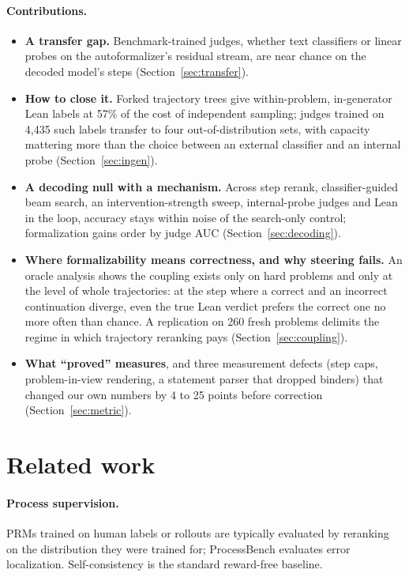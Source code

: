 \documentclass[10pt]{article}
\begin{document}
\paragraph{Contributions.}
\begin{itemize}
\item \textbf{A transfer gap.} Benchmark-trained judges, whether text classifiers or linear probes on the autoformalizer's residual stream, are near chance on the decoded model's steps (Section~\ref{sec:transfer}).
\item \textbf{How to close it.} Forked trajectory trees give within-problem, in-generator Lean labels at 57\% of the cost of independent sampling; judges trained on 4{,}435 such labels transfer to four out-of-distribution sets, with capacity mattering more than the choice between an external classifier and an internal probe (Section~\ref{sec:ingen}).
\item \textbf{A decoding null with a mechanism.} Across step rerank, classifier-guided beam search, an intervention-strength sweep, internal-probe judges and Lean in the loop, accuracy stays within noise of the search-only control; formalization gains order by judge AUC (Section~\ref{sec:decoding}).
\item \textbf{Where formalizability means correctness, and why steering fails.} An oracle analysis shows the coupling exists only on hard problems and only at the level of whole trajectories: at the step where a correct and an incorrect continuation diverge, even the true Lean verdict prefers the correct one no more often than chance. A replication on 260 fresh problems delimits the regime in which trajectory reranking pays (Section~\ref{sec:coupling}).
\item \textbf{What ``proved'' measures}, and three measurement defects (step caps, problem-in-view rendering, a statement parser that dropped binders) that changed our own numbers by 4 to 25 points before correction (Section~\ref{sec:metric}).
\end{itemize}

\section{Related work}

\paragraph{Process supervision.} PRMs trained on human labels \citep{lightman2023lets} or rollouts \citep{wang2024mathshepherd} are typically evaluated by reranking on the distribution they were trained for; ProcessBench \citep{zheng2024processbench} evaluates error localization. Self-consistency \citep{wang2023selfconsistency} is the standard reward-free baseline.
\end{document}
